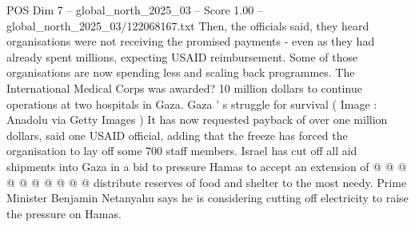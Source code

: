 \begin{textsample}{POS Dim 7 – global\_north\_2025\_03 – Score 1.00 – global\_north\_2025\_03/122068167.txt}
Then, the officials said, they heard organisations were not receiving the promised payments - even as they had already spent millions, expecting USAID reimbursement.
Some of those organisations are now spending less and scaling back programmes.
The International Medical Corps was awarded? 10 million dollars to continue operations at two hospitals in Gaza.
Gaza ' s struggle for survival ( Image : Anadolu via Getty Images ) It has now requested payback of over one million dollars, said one USAID official, adding that the freeze has forced the organisation to lay off some 700 staff members.
Israel has cut off all aid shipments into Gaza in a bid to pressure Hamas to accept an extension of @ @ @ @ @ @ @ @ @ @ distribute reserves of food and shelter to the most needy.
Prime Minister Benjamin Netanyahu says he is considering cutting off electricity to raise the pressure on Hamas.

\end{textsample}
